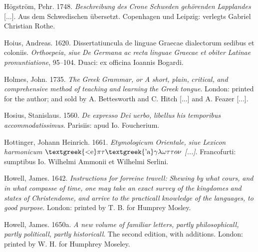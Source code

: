 Högström, Pehr. 1748. \textit{Beschreibung} \textit{des} \textit{Crone} \textit{Schweden} \textit{gehörenden} \textit{Lapplandes} [...]. Aus dem Schwedischen übersetzt. Copenhagen und Leipzig: verlegts Gabriel Christian Rothe.

Hoius, Andreas. 1620. Dissertatiuncula de linguae Graecae dialectorum sedibus et coloniis. \textit{Orthoepeia,} \textit{siue} \textit{De} \textit{Germana} \textit{ac} \textit{recta} \textit{linguae} \textit{Graecae} \textit{et} \textit{obiter} \textit{Latinae} \textit{pronuntiatione}, 95–104. Duaci: ex officina Ioannis Bogardi.

Holmes, John. 1735. \textit{The} \textit{Greek} \textit{Grammar,} \textit{or} \textit{A} \textit{short,} \textit{plain,} \textit{critical,} \textit{and} \textit{comprehensive} \textit{method} \textit{of} \textit{teaching} \textit{and} \textit{learning} \textit{the} \textit{Greek} \textit{tongue}. London: printed for the author; and sold by A. Bettesworth and C. Hitch [...] and A. Feazer [...].

Hosius, Stanislaus. 1560. \textit{De} \textit{expresso} \textit{Dei} \textit{uerbo,} \textit{libellus} \textit{his} \textit{temporibus} \textit{accommodatissimus}. Parisiis: apud Io. Foucherium.

Hottinger, Johann Heinrich. 1661. \textit{Etymologicum} \textit{Orientale,} \textit{siue} \textit{Lexicon} \textit{harmonicum} \textit{$\text{\textgreek{<e}}\pi \tau \text{\textgreek{'a}}\gamma \lambda \omega \tau \tau o\nu $ [...]}. Francofurti: sumptibus Io. Wilhelmi Ammonii et Wilhelmi Serlini.

Howell, James. 1642. \textit{Instructions} \textit{for} \textit{forreine} \textit{travell:} \textit{Shewing} \textit{by} \textit{what} \textit{cours,} \textit{and} \textit{in} \textit{what} \textit{compasse} \textit{of} \textit{time,} \textit{one} \textit{may} \textit{take} \textit{an} \textit{exact} \textit{survey} \textit{of} \textit{the} \textit{kingdomes} \textit{and} \textit{states} \textit{of} \textit{Christendome,} \textit{and} \textit{arrive} \textit{to} \textit{the} \textit{practicall} \textit{knowledge} \textit{of} \textit{the} \textit{languages,} \textit{to} \textit{good} \textit{purpose}. London: printed by T. B. for Humprey Mosley.

Howell, James. 1650a. \textit{A} \textit{new} \textit{volume} \textit{of} \textit{familiar} \textit{letters,} \textit{partly} \textit{philosophicall,} \textit{partly} \textit{politicall,} \textit{partly} \textit{historicall}. The second edition, with additions. London: printed by W. H. for Humphrey Moseley.


